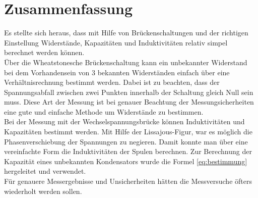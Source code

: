 \documentclass[a4paper,usenatbib]{aspdoc}
\begin{document}
    \section{Zusammenfassung}\label{sec:conclusion}
        Es stellte sich heraus, dass mit Hilfe von Brückenschaltungen und der richtigen Einstellung Widerstände, Kapazitäten und Induktivitäten relativ simpel berechnet werden können.\\
        Über die Wheatstonesche Brückenschaltung kann ein unbekannter Widerstand bei dem Vorhandensein von 3 bekannten Widerständen einfach über eine Verhältnisrechnung bestimmt werden. Dabei ist zu beachten, dass der Spannungsabfall zwischen zwei Punkten innerhalb der Schaltung gleich Null sein muss. Diese Art der Messung ist bei genauer Beachtung der Messungsicherheiten eine gute und einfache Methode um Widerstände zu bestimmen.\\ 
        Bei der Messung mit der Wechselspannungsbrücke können Induktivitäten und Kapazitäten bestimmt werden. Mit Hilfe der Lissajous-Figur, war es möglich die Phasenverschiebung der Spannungen zu negieren. Damit konnte man über eine vereinfachte Form die Induktivitäten der Spulen berechnen. Zur Berechnung der Kapazität eines unbekannten Kondensators wurde die Formel \ref{eq:bestimmung} hergeleitet und verwendet.\\
        Für genauere Messergebnisse und Unsicherheiten hätten die Messversuche öfters wiederholt werden sollen. 
        
    
    
    


    \appendix
\end{document}
